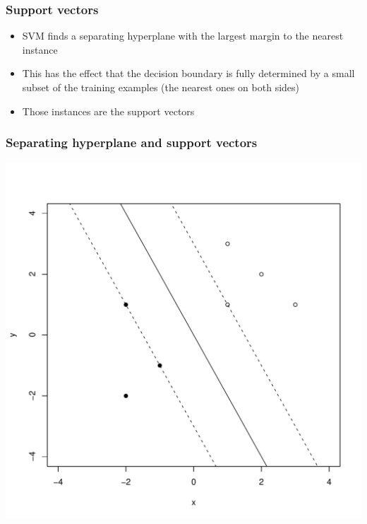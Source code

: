 \documentclass{beamer}
\begin{document}
\begin{frame}
 \frametitle{Support vectors}
\begin{itemize}
\item 

  SVM finds a separating hyperplane with the largest margin to the
  nearest instance
\item This has the effect that the decision boundary is fully
  determined by a small subset of the training examples (the nearest
  ones on both sides)
\item Those instances are the
\alert{support vectors} 
\end{itemize}
\end{frame}


\begin{frame}\frametitle{Separating hyperplane and support vectors}
\begin{center}
  \includegraphics[scale=0.5]{svm-margin.pdf}
\end{center}

\end{frame}
\end{document}
